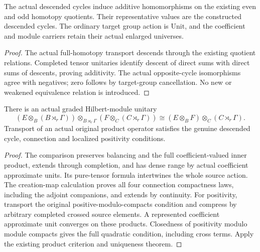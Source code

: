 \begin{proposition}\label{prop:descent-quotient-homomorphism}
\leanok
The actual descended cycles induce additive homomorphisms on the existing
even and odd homotopy quotients. Their representative values are the
constructed descended cycles. The ordinary target group action is
$\mathrm{Unit}$, and the coefficient and module carriers retain their actual
enlarged universes.
\end{proposition}
\begin{proof}
\leanok
The actual full-homotopy transport descends through the existing quotient
relations. Completed tensor unitaries identify descent of direct sums with
direct sums of descents, proving additivity. The actual opposite-cycle
isomorphisms agree with negatives; zero follows by target-group cancellation.
No new or weakened equivalence relation is introduced.
\end{proof}


\begin{proposition}\label{prop:descent-tensor-product}
\leanok
There is an actual graded Hilbert-module unitary
\[
 (E\otimes_B(B\rtimes_r\Gamma))\otimes_{B\rtimes_r\Gamma}
 (F\otimes_C(C\rtimes_r\Gamma))
 \cong (E\otimes_B F)\otimes_C(C\rtimes_r\Gamma).
\]
Transport of an actual original product operator satisfies the genuine
descended cycle, connection and localized positivity conditions.
\end{proposition}
\begin{proof}
\leanok
The comparison preserves balancing and the full coefficient-valued inner
product, extends through completion, and has dense range by actual coefficient
approximate units. Its pure-tensor formula intertwines the whole source action.
The creation-map calculation proves all four connection compactness laws,
including the adjoint companions, and extends by continuity. For positivity,
transport the original positive-modulo-compacts condition and compress by
arbitrary completed crossed source elements. A represented coefficient
approximate unit converges on these products. Closedness of positivity modulo
module compacts gives the full quadratic condition, including cross terms.
Apply the existing product criterion and uniqueness theorem.
\end{proof}


